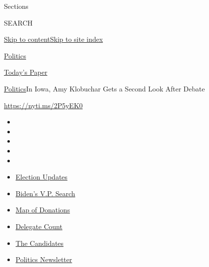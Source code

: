 Sections

SEARCH

\protect\hyperlink{site-content}{Skip to
content}\protect\hyperlink{site-index}{Skip to site index}

\href{https://www.nytimes.com/section/politics}{Politics}

\href{https://myaccount.nytimes.com/auth/login?response_type=cookie\&client_id=vi}{}

\href{https://www.nytimes.com/section/todayspaper}{Today's Paper}

\href{/section/politics}{Politics}\textbar{}In Iowa, Amy Klobuchar Gets
a Second Look After Debate

\url{https://nyti.ms/2P5yEK0}

\begin{itemize}
\item
\item
\item
\item
\item
\end{itemize}

\begin{itemize}
\item
  \href{https://www.nytimes.com/2020/07/31/us/elections/biden-vs-trump.html?action=click\&pgtype=Article\&state=default\&region=TOP_BANNER\&context=storylines_menu}{Election
  Updates}
\item
  \href{https://www.nytimes.com/article/biden-vice-president-2020.html?action=click\&pgtype=Article\&state=default\&region=TOP_BANNER\&context=storylines_menu}{Biden's
  V.P. Search}
\item
  \href{https://www.nytimes.com/interactive/2020/07/24/us/politics/trump-biden-campaign-donors.html?action=click\&pgtype=Article\&state=default\&region=TOP_BANNER\&context=storylines_menu}{Map
  of Donations}
\item
  \href{https://www.nytimes.com/interactive/2020/us/elections/delegate-count-primary-results.html?action=click\&pgtype=Article\&state=default\&region=TOP_BANNER\&context=storylines_menu}{Delegate
  Count}
\item
  \href{https://www.nytimes.com/interactive/2019/us/politics/2020-presidential-candidates.html?action=click\&pgtype=Article\&state=default\&region=TOP_BANNER\&context=storylines_menu}{The
  Candidates}
\item
  \href{https://www.nytimes.com/newsletters/politics?action=click\&pgtype=Article\&state=default\&region=TOP_BANNER\&context=storylines_menu}{Politics
  Newsletter}
\end{itemize}

